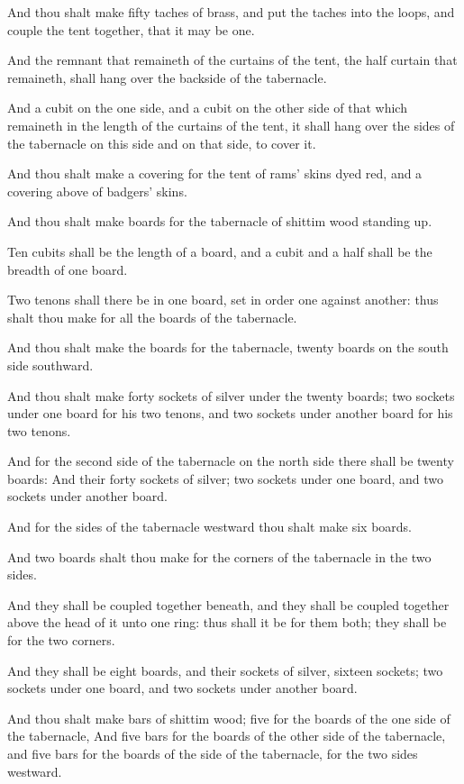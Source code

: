 \verse And thou shalt make fifty taches of brass, and put the taches into the loops, and couple the tent together, that it may be one.

\verse And the remnant that remaineth of the curtains of the tent, the half curtain that remaineth, shall hang over the backside of the tabernacle.

\verse And a cubit on the one side, and a cubit on the other side of that which remaineth in the length of the curtains of the tent, it shall hang over the sides of the tabernacle on this side and on that side, to cover it.

\verse And thou shalt make a covering for the tent of rams' skins dyed red, and a covering above of badgers' skins.

\verse And thou shalt make boards for the tabernacle of shittim wood standing up.

\verse Ten cubits shall be the length of a board, and a cubit and a half shall be the breadth of one board.

\verse Two tenons shall there be in one board, set in order one against another: thus shalt thou make for all the boards of the tabernacle.

\verse And thou shalt make the boards for the tabernacle, twenty boards on the south side southward.

\verse And thou shalt make forty sockets of silver under the twenty boards; two sockets under one board for his two tenons, and two sockets under another board for his two tenons.

\verse And for the second side of the tabernacle on the north side there shall be twenty boards: \verse And their forty sockets of silver; two sockets under one board, and two sockets under another board.

\verse And for the sides of the tabernacle westward thou shalt make six boards.

\verse And two boards shalt thou make for the corners of the tabernacle in the two sides.

\verse And they shall be coupled together beneath, and they shall be coupled together above the head of it unto one ring: thus shall it be for them both; they shall be for the two corners.

\verse And they shall be eight boards, and their sockets of silver, sixteen sockets; two sockets under one board, and two sockets under another board.

\verse And thou shalt make bars of shittim wood; five for the boards of the one side of the tabernacle, \verse And five bars for the boards of the other side of the tabernacle, and five bars for the boards of the side of the tabernacle, for the two sides westward.

